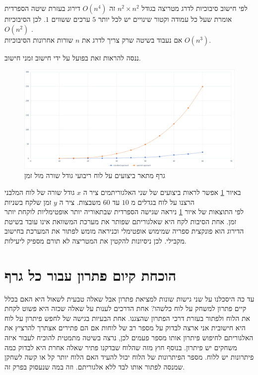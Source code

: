 \documentclass[12pt,twoside]{article}
\begin{document}
לפי חישוב סיבוכיות
לדרג מטריצה 
בגודל 
$n^2 \times n^2$
זה 
$O(n^4)$
דירוג בעזרת שיטה הספרדית אומרת
שעל כל עמודה 
וקטור שינויים 
יש לכל יותר
$5$
ערכים ששווים 
$1$.
לכן הסיבוכיות 
$O(n^2)$
.
\\
אם נעבוד בשיטה 
שרק צריך לדרג את
$n$
שורות 
אחרונות
הסיבוכיות 
$O(n^3)$.

ננסה להראות זאת בפועל על ידי חישוב זמני חישוב.

\begin{figure}[ht]
    \caption{ 
    גרף מתאר ביצועים על לוח ריבועי גודל שורה מול זמן
    }
    \label{fig:prefofmance_diagram}
    \unsethebrew
    \centering
    \includegraphics[width=\textwidth,height=\textheight,keepaspectratio]{images/benchmark.png}
\end{figure}
\sethebrew

באיור 
\ref{fig:prefofmance_diagram}
אפשר לראות ביצועים
של שני האלגוריתמים ציר 
ה
$x$
גודל שורה של לוח המלבני
הרצנו על 
לוח בגדלים 
מ
$10$
עד 
$60$
משבצות.
ציר ה
$y$
זמן שלקח 
בשניות
\\
לפי התוצאות של איור 
\ref{fig:prefofmance_diagram}
ניראה 
שגישה הספרדית שבתאוריה יותר אופטימליות לוקחת יותר זמן.
אחת הסיבות לקח היא שאלגוריתם שפותר את מערכת המשוואת אינו עובד בשיטת הדירוג
הוא פונקצית ספריה שמימוש אופטימלי וכניראה מומש לפתור את המערכת בחישוב מקבילי.
לכן ניסיונות להקטין  את המטריצה לא תורם מספיק ליעילות.

\newpage
\section{הוכחת  קיום פתרון עבור כל גרף}
עד כה היסכלנו על שני גישות שונות למציאת פתרון
אבל שאלה טבעית לשאול היא האם בכלל קיים פתרון למשחק על לוח כלשהו?
אחת הדרכים לענות על שאלה שכזה היא פשוט לקחת את הלוח ולפתור בעזרת 
דרכי הפתרון שהצגנו.
אחת הבעיות בגישה של לחפש פיתרון על לוח היא חישובית אני ארצה 
לבדוק על מספר רב של לוחות אם הם פתירים אצתרך להרציץ
את האלגוריתם לחיפוש פיתרון אותו מספר פעמים
לכן, נרצה בשיטה מתמטית להוכיח לעבור איזה משחקים יש פיתרון.
בנוסף חוץ מזה שהלוח שבדקנו פתיר שאלה אחרת היא לבדוק כמה פיתרונות יש ללוח.
מספר הפיתרונות של הלוח יכול להעיד האם הלוח יותר קל או קשה לשחקן שמנסה לפתור אותו
לבד ללא אלגוריתם.
וזה במה שנעסוק בפרק זה.
\end{document}
